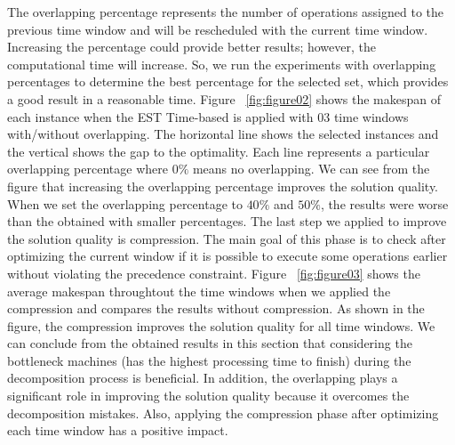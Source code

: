 \documentclass[submission,copyright,creativecommons]{eptcs}
\begin{document}
The overlapping percentage represents the number of operations assigned to the previous time window and will be rescheduled with the current time window. Increasing the percentage could provide better results; however, the computational time will increase. So, we run the experiments with overlapping percentages to determine the best percentage for the selected set, which provides a good result in a reasonable time. Figure ~\ref{fig:figure02} shows the makespan of each instance when the EST Time-based is applied with $03$ time windows with/without overlapping. The horizontal line shows the selected instances and the vertical shows the gap to the optimality. Each line represents a particular overlapping percentage where $0\%$ means no overlapping. We can see from the figure that increasing the overlapping percentage improves the solution quality. When we set the overlapping percentage to $40\%$ and $50\%$, the results were worse than the obtained with smaller percentages. The last step we applied to improve the solution quality is compression. The main goal of this phase is to check after optimizing the current window if it is possible to execute some operations earlier without violating the precedence constraint. Figure ~\ref{fig:figure03} shows the average makespan throughtout the time windows when we applied the compression and compares the results without compression. As shown in the figure, the compression improves the solution quality for all time windows. We can conclude from the obtained results in this section that considering the bottleneck machines (has the highest processing time to finish) during the decomposition process is beneficial. In addition, the overlapping plays a significant role in improving the solution quality because it overcomes the decomposition mistakes. Also, applying the compression phase after optimizing each time window has a positive impact. 

\mydata
\end{document}

